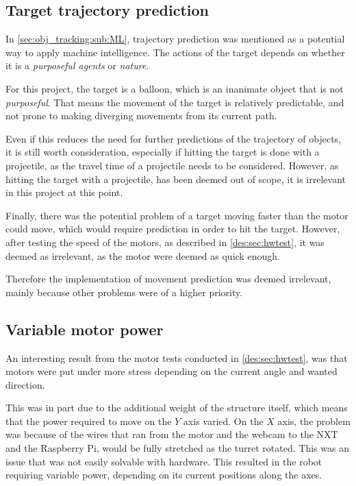 \subsection{Target trajectory prediction}
In \autoref{sec:obj_tracking:sub:ML}, trajectory prediction was mentioned as a potential way to apply machine intelligence.
The actions of the target depends on whether it is a \textit{purposeful agents} or \textit{nature}.

For this project, the target is a balloon, which is an inanimate object that is not \textit{purposeful}.
That means the movement of the target is relatively predictable, and not prone to making diverging movements from its current path.

Even if this reduces the need for further predictions of the trajectory of objects, it is still worth consideration, especially if hitting the target is done with a projectile, as the travel time of a projectile needs to be considered.
However, as hitting the target with a projectile, has been deemed out of scope, it is irrelevant in this project at this point.

Finally, there was the potential problem of a target moving faster than the motor could move, which would require prediction in order to hit the target.
However, after testing the speed of the motors, as described in \autoref{des:sec:hwtest}, it was deemed as irrelevant, as the motor were deemed as quick enough.

Therefore the implementation of movement prediction was deemed irrelevant, mainly because other problems were of a higher priority.

\subsection{Variable motor power}
An interesting result from the motor tests conducted in \autoref{des:sec:hwtest}, was that motors were put under more stress depending on the current angle and wanted direction.

This was in part due to the additional weight of the structure itself, which means that the power required to move on the $Y$ axis varied.
On the $X$ axis, the problem was because of the wires that ran from the motor and the webcam to the NXT and the Raspberry Pi, would be fully stretched as the turret rotated.
This was an issue that was not easily solvable with hardware.
This resulted in the robot requiring variable power, depending on its current positions along the axes.

